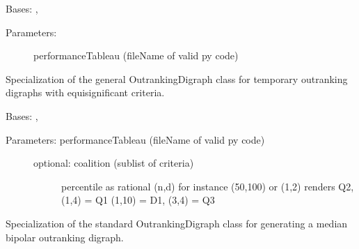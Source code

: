 \documentclass[letterpaper,10pt,english]{sphinxmanual}
\begin{document}

\begin{fulllineitems}
\label{techDoc:outrankingDigraphs.EquiSignificanceMajorityOutrankingDigraph}
Bases: {\hyperref[techDoc:outrankingDigraphs.BipolarOutrankingDigraph]{}}, {\hyperref[techDoc:perfTabs.PerformanceTableau]{}}
\begin{description}
\item[{Parameters:}] \leavevmode
performanceTableau (fileName of valid py code)

\end{description}

Specialization of the general OutrankingDigraph class for 
temporary outranking digraphs with equisignificant criteria.

\end{fulllineitems}


\begin{fulllineitems}
\label{techDoc:outrankingDigraphs.MedianBipolarOutrankingDigraph}
Bases: {\hyperref[techDoc:outrankingDigraphs.BipolarOutrankingDigraph]{}}, {\hyperref[techDoc:perfTabs.PerformanceTableau]{}}
\begin{description}
\item[{Parameters: performanceTableau (fileName of valid py code)}] \leavevmode\begin{description}
\item[{optional: coalition (sublist of criteria)}] \leavevmode
percentile as rational (n,d)
for instance (50,100) or (1,2) renders Q2, (1,4) = Q1
(1,10) = D1, (3,4) = Q3

\end{description}

\end{description}

Specialization of the standard OutrankingDigraph class for generating
a median bipolar outranking digraph.

\end{fulllineitems}
\end{document}
